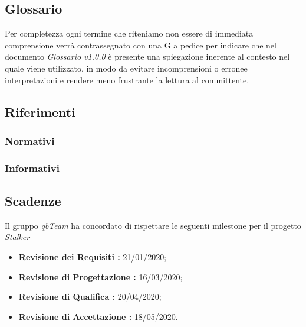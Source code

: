 \subsection{Glossario}
Per completezza ogni termine che riteniamo non essere di immediata comprensione verrà contrassegnato con una G a pedice per indicare che nel documento \textit{Glossario v1.0.0} è presente una spiegazione inerente al contesto nel quale viene utilizzato,
in modo da evitare incomprensioni o erronee interpretazioni e rendere meno frustrante la lettura al committente.

\subsection{Riferimenti}
\subsubsection{Normativi}
\subsubsection{Informativi}

\subsection{Scadenze}
Il gruppo \textit{qbTeam} ha concordato di rispettare le seguenti milestone per il progetto \textit{Stalker}
\begin{itemize}
    \item \textbf{Revisione dei Requisiti : } 21/01/2020;
    \item \textbf{Revisione di Progettazione : } 16/03/2020;
    \item \textbf{Revisione di Qualifica : } 20/04/2020;
    \item \textbf{Revisione di Accettazione : } 18/05/2020.
\end{itemize}